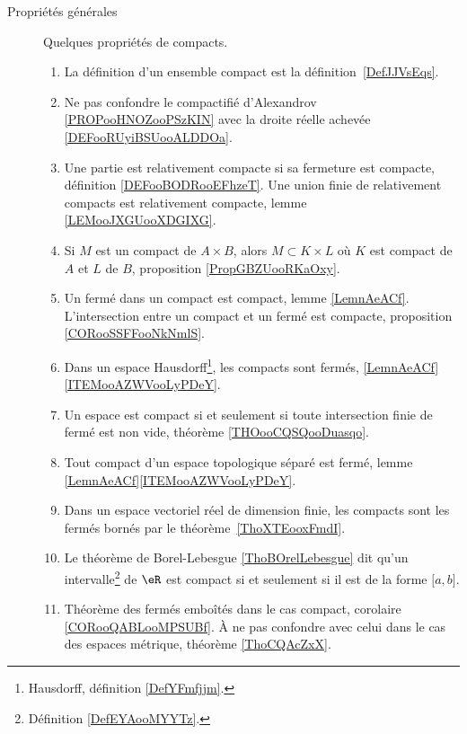         \label{THEMEooQQBHooLcqoKB}
\begin{description}

	\item[Propriétés générales]

		Quelques propriétés de compacts.

		\begin{enumerate}
			\item
			      La définition d'un ensemble compact est la définition~\ref{DefJJVsEqs}.
			\item
			      Ne pas confondre le compactifié d'Alexandrov \ref{PROPooHNOZooPSzKIN} avec la droite réelle achevée \ref{DEFooRUyiBSUooALDDOa}.
			\item
			      Une partie est relativement compacte si sa fermeture est compacte, définition \ref{DEFooBODRooEFhzeT}. Une union finie de relativement compacts est relativement compacte, lemme \ref{LEMooJXGUooXDGIXG}.
			\item
			      Si \( M\) est un compact de \( A\times B\), alors \( M\subset K\times L\) où \( K\) est compact de \( A\) et \( L\) de \( B\), proposition \ref{PropGBZUooRKaOxy}.
			\item
			      Un fermé dans un compact est compact, lemme \ref{LemnAeACf}. L'intersection entre un compact et un fermé est compacte, proposition \ref{CORooSSFFooNkNmlS}.
			\item
			      Dans un espace Hausdorff\footnote{Hausdorff, définition \ref{DefYFmfjjm}.}, les compacts sont fermés, \ref{LemnAeACf}\ref{ITEMooAZWVooLyPDeY}.
			\item
			      Un espace est compact si et seulement si toute intersection finie de fermé est non vide, théorème \ref{THOooCQSQooDuasqo}.
			\item
			      Tout compact d'un espace topologique séparé est fermé, lemme \ref{LemnAeACf}\ref{ITEMooAZWVooLyPDeY}.
			\item
			      Dans un espace vectoriel réel de dimension finie, les compacts sont les fermés bornés par le théorème~\ref{ThoXTEooxFmdI}.
			\item
			      Le théorème de Borel-Lebesgue \ref{ThoBOrelLebesgue} dit qu'un intervalle\footnote{Définition \ref{DefEYAooMYYTz}.} de \( \eR\) est compact si et seulement si il est de la forme \( \mathopen[ a , b \mathclose]\).
			\item
			      Théorème des fermés emboîtés dans le cas compact, corolaire \ref{CORooQABLooMPSUBf}. À ne pas confondre avec celui dans le cas des espaces métrique, théorème \ref{ThoCQAcZxX}.

\end{enumerate}
\end{description}
